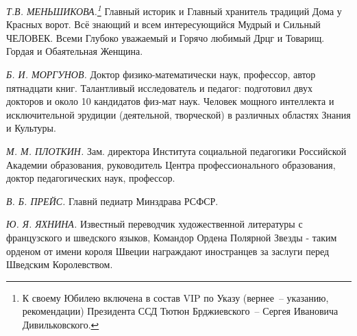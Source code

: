 \newpage

\textit{Т.В. МЕНЬШИКОВА.\protect\footnote{К своему Юбилею включена в состав VIP по Указу (вернее~-- указанию, рекомендации) Президента ССД Тютюн Брджиевского~-- Сергея Ивановича Дивильковского.}} Главный историк и Главный хранитель традиций Дома у Красных ворот. Всё знающий и всем интересующийся Мудрый и Сильный ЧЕЛОВЕК. Всеми Глубоко уважаемый и Горячо любимый Дрцг и Товарищ. Гордая и Обаятельная Женщина.

\indent

\textit{Б. И. МОРГУНОВ.} Доктор физико-математически наук, профессор, автор пятнадцати книг. Талантливый исследователь и педагог: подготовил двух докторов и около 10 кандидатов физ-мат наук. Человек мощного интеллекта и исключительной эрудиции (деятельной, творческой) в различных областях Знания и Культуры.



\indent

\textit{М. М. ПЛОТКИН.} Зам. директора Института социальной педагогики Российской Академии образования, руководитель Центра профессионального образования, доктор педагогических наук, профессор.

\indent

\textit{В. Б. ПРЕЙС.} Главнй педиатр Минздрава РСФСР.

\indent

\textit{Ю. Я. ЯХНИНА.} Известный переводчик художественной литературы с французского и шведского языков,  Командор Ордена Полярной Звезды - таким орденом от имени короля Швеции награждают иностранцев за  заслуги перед Шведским Королевством.
